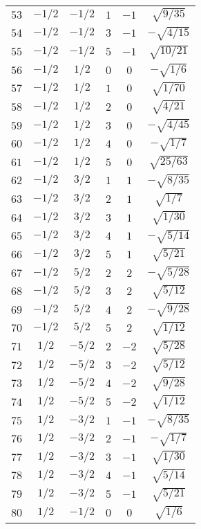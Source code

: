 \begin{table}
\begin{center}
\begin{tabular}{|c|c|c|c|c|c|}
$53$ & $-1/2$ & $-1/2$ & $1$ & $-1$ & $\sqrt{9/35}$ \\ 
$54$ & $-1/2$ & $-1/2$ & $3$ & $-1$ & $-\sqrt{4/15}$ \\ 
$55$ & $-1/2$ & $-1/2$ & $5$ & $-1$ & $\sqrt{10/21}$ \\ 
$56$ & $-1/2$ & $1/2$ & $0$ & $0$ & $-\sqrt{1/6}$ \\ 
$57$ & $-1/2$ & $1/2$ & $1$ & $0$ & $\sqrt{1/70}$ \\ 
$58$ & $-1/2$ & $1/2$ & $2$ & $0$ & $\sqrt{4/21}$ \\ 
$59$ & $-1/2$ & $1/2$ & $3$ & $0$ & $-\sqrt{4/45}$ \\ 
$60$ & $-1/2$ & $1/2$ & $4$ & $0$ & $-\sqrt{1/7}$ \\ 
$61$ & $-1/2$ & $1/2$ & $5$ & $0$ & $\sqrt{25/63}$ \\ 
$62$ & $-1/2$ & $3/2$ & $1$ & $1$ & $-\sqrt{8/35}$ \\ 
$63$ & $-1/2$ & $3/2$ & $2$ & $1$ & $\sqrt{1/7}$ \\ 
$64$ & $-1/2$ & $3/2$ & $3$ & $1$ & $\sqrt{1/30}$ \\ 
$65$ & $-1/2$ & $3/2$ & $4$ & $1$ & $-\sqrt{5/14}$ \\ 
$66$ & $-1/2$ & $3/2$ & $5$ & $1$ & $\sqrt{5/21}$ \\ 
$67$ & $-1/2$ & $5/2$ & $2$ & $2$ & $-\sqrt{5/28}$ \\ 
$68$ & $-1/2$ & $5/2$ & $3$ & $2$ & $\sqrt{5/12}$ \\ 
$69$ & $-1/2$ & $5/2$ & $4$ & $2$ & $-\sqrt{9/28}$ \\ 
$70$ & $-1/2$ & $5/2$ & $5$ & $2$ & $\sqrt{1/12}$ \\ 
$71$ & $1/2$ & $-5/2$ & $2$ & $-2$ & $\sqrt{5/28}$ \\ 
$72$ & $1/2$ & $-5/2$ & $3$ & $-2$ & $\sqrt{5/12}$ \\ 
$73$ & $1/2$ & $-5/2$ & $4$ & $-2$ & $\sqrt{9/28}$ \\ 
$74$ & $1/2$ & $-5/2$ & $5$ & $-2$ & $\sqrt{1/12}$ \\ 
$75$ & $1/2$ & $-3/2$ & $1$ & $-1$ & $-\sqrt{8/35}$ \\ 
$76$ & $1/2$ & $-3/2$ & $2$ & $-1$ & $-\sqrt{1/7}$ \\ 
$77$ & $1/2$ & $-3/2$ & $3$ & $-1$ & $\sqrt{1/30}$ \\ 
$78$ & $1/2$ & $-3/2$ & $4$ & $-1$ & $\sqrt{5/14}$ \\ 
$79$ & $1/2$ & $-3/2$ & $5$ & $-1$ & $\sqrt{5/21}$ \\ 
$80$ & $1/2$ & $-1/2$ & $0$ & $0$ & $\sqrt{1/6}$ \\ 

\end{tabular}
\end{center}
\end{table}
